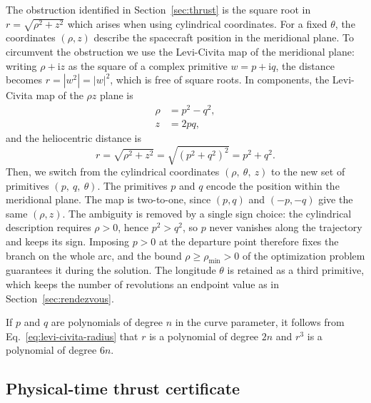 \documentclass[a4paper,fleqn]{cas-sc}
\begin{document}
The obstruction identified in Section~\ref{sec:thrust} is the square root in
$r=\sqrt{\rho^2+z^2}$ which arises when using cylindrical coordinates. For a
fixed $\theta$, the coordinates $(\rho,z)$ describe the spacecraft position
in the meridional plane. To circumvent the obstruction we use the Levi-Civita
map of the meridional plane: writing $\rho+\mathrm{i}z$ as the square of a
complex primitive $w=p+\mathrm{i}q$, the distance becomes
$r=|w^2|=|w|^2$, which is free of square roots. In components, the
Levi-Civita map of the $\rho z$ plane is
\begin{equation}
	\begin{aligned}
		\rho &= p^2-q^2,\\
		z &= 2pq,
	\end{aligned}
	\label{eq:levi-civita-map}
\end{equation}
and the heliocentric distance is
\begin{equation}
	r = \sqrt{\rho^2+z^2}=\sqrt{(p^2+q^2)^2}=p^2+q^2.
	\label{eq:levi-civita-radius}
\end{equation}
Then, we switch from the cylindrical coordinates $(\rho,\>\theta,\> z)$ to the
new set of primitives $(p,\>q,\>\theta)$. The primitives $p$ and $q$ encode
the position within the meridional plane. The map is two-to-one, since
$(p,q)$ and $(-p,-q)$ give the same $(\rho,z)$. The ambiguity is removed by a
single sign choice: the cylindrical description requires $\rho>0$, hence
$p^2>q^2$, so $p$ never vanishes along the trajectory and keeps its sign.
Imposing $p>0$ at the departure point therefore fixes the branch on the
whole arc, and the bound $\rho\geq\rho_{\min}>0$ of the optimization problem
guarantees it during the solution. The longitude $\theta$ is retained as a
third primitive, which keeps the number of revolutions an endpoint value as
in Section~\ref{sec:rendezvous}.

If $p$ and $q$ are polynomials of degree $n$ in the curve parameter, it
follows from Eq.~\eqref{eq:levi-civita-radius} that $r$ is a polynomial of
degree $2n$ and $r^3$ is a polynomial of degree $6n$.

\subsection{Physical-time thrust certificate}
\label{sec:time-certificate}
\end{document}
